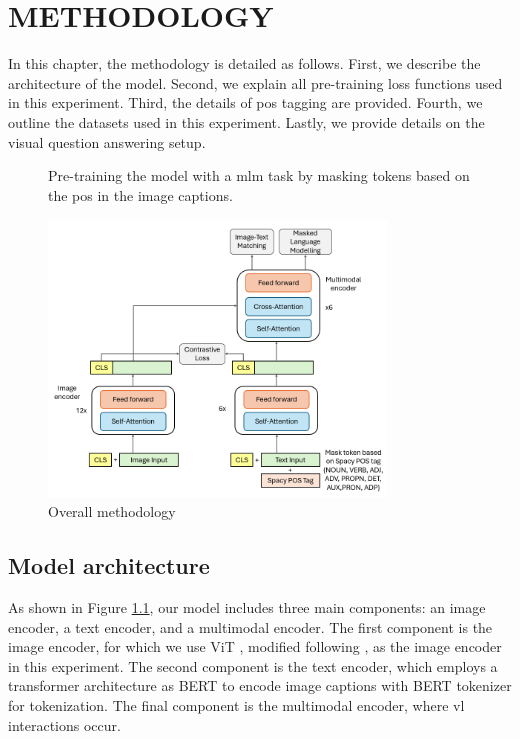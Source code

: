 \chapter{METHODOLOGY}
In this chapter, the methodology is detailed as follows.  
First, we describe the architecture of the model.  
Second, we explain all pre-training loss functions used in this experiment.  
Third, the details of \acrshort{pos} tagging are provided.  
Fourth, we outline the datasets used in this experiment.  
Lastly, we provide details on the visual question answering setup.  

\begin{figure}[h]
    Pre-training the model with a \acrshort{mlm} task by masking tokens based on the \acrshort{pos} in the image captions.
    \begin{center}
        \includegraphics[width=0.8\textwidth]{Images/overview.png}
    \end{center}
    \small
    \caption{Overall methodology}
    \label{fig:overview}
\end{figure}

\section{Model architecture}
As shown in Figure \ref{fig:overview}, our model includes three main components: an image encoder, a text encoder, and a multimodal encoder.  
The first component is the image encoder, for which we use ViT \cite{vit}, modified following \cite{clip}, as the image encoder in this experiment.  
The second component is the text encoder, which employs a transformer architecture as BERT \cite{bert} to encode image captions with BERT tokenizer for tokenization.  
The final component is the multimodal encoder, where \acrshort{vl} interactions occur.  


